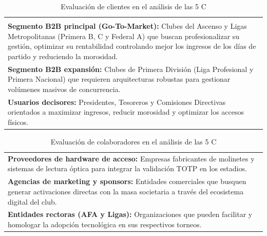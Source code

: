 \vspace{0.3cm}

\begin{table}[h!]
\centering
\renewcommand{\arraystretch}{1.5}
\begin{tabularx}{\textwidth}{|X|}
\hline
\rowcolor{cyan!20} \multicolumn{1}{|c|}{\textbf{CLIENTES}} \\ \hline
\rowcolor{cyan!10} \multicolumn{1}{|c|}{\textbf{Segmentos objetivos}} \\ \hline
\textbf{Segmento B2B principal (Go-To-Market):} Clubes del Ascenso y Ligas Metropolitanas (Primera B, C y Federal A) que buscan profesionalizar su gestión, optimizar su rentabilidad controlando mejor los ingresos de los días de partido y reduciendo la morosidad. \\
\textbf{Segmento B2B expansión:} Clubes de Primera División (Liga Profesional y Primera Nacional) que requieren arquitecturas robustas para gestionar volúmenes masivos de concurrencia. \\
\textbf{Usuarios decisores:} Presidentes, Tesoreros y Comisiones Directivas orientados a maximizar ingresos, reducir morosidad y optimizar los accesos físicos. \\ \hline
\end{tabularx}
\caption{Evaluación de clientes en el análisis de las 5 C}
\label{tab:tabla_clientes}
\end{table}

\vspace{0.3cm}

\begin{table}[h!]
\centering
\renewcommand{\arraystretch}{1.5}
\begin{tabularx}{\textwidth}{|X|}
\hline
\rowcolor{green!20} \multicolumn{1}{|c|}{\textbf{COLABORADORES}} \\ \hline
\textbf{Proveedores de hardware de acceso:} Empresas fabricantes de molinetes y sistemas de lectura óptica para integrar la validación TOTP en los estadios. \\
\textbf{Agencias de marketing y sponsors:} Entidades comerciales que busquen generar activaciones directas con la masa societaria a través del ecosistema digital del club. \\
\textbf{Entidades rectoras (AFA y Ligas):} Organizaciones que pueden facilitar y homologar la adopción tecnológica en sus respectivos torneos. \\ \hline
\end{tabularx}
\caption{Evaluación de colaboradores en el análisis de las 5 C}
\label{tab:tabla_colaboradores}
\end{table}

